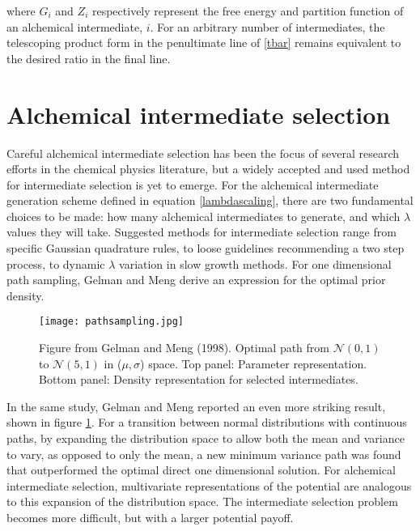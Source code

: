 \noindent where $G_i$ and $Z_i$ respectively represent the free energy and partition function of an alchemical intermediate, $i$. For an arbitrary number of intermediates, the telescoping product form in the penultimate line of \eqref{tbar} remains equivalent to the desired ratio in the final line. 

\section{Alchemical intermediate selection}

Careful alchemical intermediate selection has been the focus of several research efforts in the chemical physics literature\cite{pham2011identifying,lu1999optimal,blondel2004ensemble,resat1993studies}, but a widely accepted and used method for intermediate selection is yet to emerge\cite{wu2005phase2}. For the alchemical intermediate generation scheme defined in equation \eqref{lambdascaling}, there are two fundamental choices to be made: how many alchemical intermediates to generate, and which $\lambda$ values they will take. Suggested methods for intermediate selection range from specific Gaussian quadrature rules\cite{AMBER14manual}, to loose guidelines recommending a two step process\cite{shirts2007alchemical}, to dynamic $\lambda$ variation in slow growth methods\cite{pearlman1989new}. For one dimensional path sampling, Gelman and Meng\cite{gelman1998simulating} derive an expression for the optimal prior density.

\begin{figure}
    \centering
    \texttt{[image: pathsampling.jpg]}
    \caption[Gelman and Meng's optimal bridging densities for normal distributions]{Figure from Gelman and Meng (1998). Optimal path from $\mathcal{N}(0,1)$ to $\mathcal{N}(5,1)$ in ($\mu, \sigma$) space. Top panel: Parameter representation. Bottom panel: Density representation for selected intermediates.}
    \label{GMnormnorm}
\end{figure}

In the same study, Gelman and Meng reported an even more striking result, shown in figure \ref{GMnormnorm}.
For a transition between normal distributions with continuous paths, by expanding the distribution space to allow both the mean and variance to vary, as opposed to only the mean, a new minimum variance path was found that outperformed the optimal direct one dimensional solution. For alchemical intermediate selection, multivariate representations of the potential are analogous to this expansion of the distribution space. The intermediate selection problem becomes more difficult, but with a larger potential payoff.
